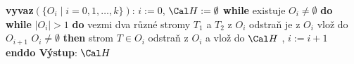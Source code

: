 \documentclass[a4paper,12pt]{article}
\begin{document}
{\bf vyvaz$(\{O_i\mid i=0,1,\dots,k\})$}:\newline 
$i:=0$, $\Cal H:=\emptyset$\newline 
{\bf while} existuje $O_i\ne\emptyset$ {\bf do\newline 
\phantom{{\rm ---}}while} $|O_i|>1$ {\bf do\newline 
\phantom{{\rm ------}}}vezmi dva různé stromy $T_1$ a $
T_2$ z 
$O_i$\newline 
\phantom{------}odstraň je z $O_i$\newline 
\phantom{------}{\bf spoj$(T_1,T_2)$} vlož do $O_{i+1}$\newline 
{} $O_i\ne\emptyset$ {\bf then\newline 
\phantom{{\rm ------}}}strom $T\in O_i$ odstraň z $O_i$ a vlož do $
\Cal H$\newline 
\phantom{---}{\bf endif},\newline 
\phantom{---}$i:=i+1$\newline 
{\bf enddo\newline 
Výstup}: $\Cal H$
\end{document}
